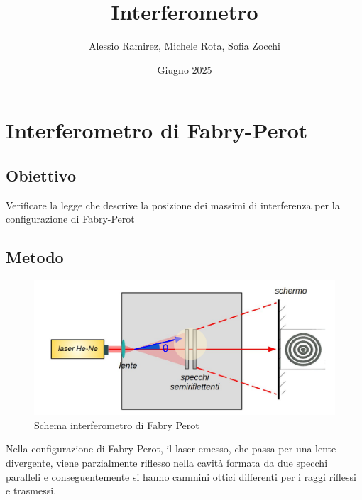 \documentclass[a4paper]{article}
\title{Interferometro}
\author{Alessio Ramirez, Michele Rota, Sofia Zocchi}
\date{Giugno 2025}
\begin{document}
\maketitle
\tableofcontents

\section{Interferometro di Fabry-Perot}
\subsection{Obiettivo}
Verificare la legge che descrive la posizione dei massimi di interferenza per la configurazione di Fabry-Perot

\subsection{Metodo}

\begin{figure}[htbp]
\centering
\includegraphics[width=1.0\textwidth]{./grafici/fabry_perot_immagine}
\caption{Schema interferometro di Fabry Perot}
\label{fig:fabry-perot-schema}
\end{figure}
Nella configurazione di Fabry-Perot, il laser emesso, che passa per una lente divergente, viene parzialmente riflesso nella cavità formata da due specchi paralleli e conseguentemente si hanno cammini ottici differenti per i raggi riflessi e trasmessi. 
\end{document}
